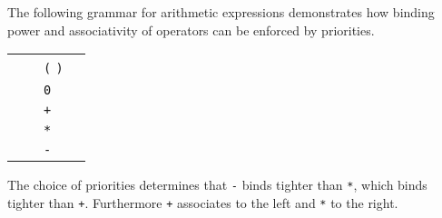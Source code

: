 \begin{isabellebody}
\begin{isamarkuptext}
  \medskip The following grammar for arithmetic expressions
  demonstrates how binding power and associativity of operators can be
  enforced by priorities.

  \begin{center}
  \begin{tabular}{rclr}
  \isa{{\isachardoublequote}A\isactrlsup {\isacharparenleft}\isactrlsup {\isadigit{1}}\isactrlsup {\isadigit{0}}\isactrlsup {\isadigit{0}}\isactrlsup {\isadigit{0}}\isactrlsup {\isacharparenright}{\isachardoublequote}} & \isa{{\isachardoublequote}{\isacharequal}{\isachardoublequote}} & \verb|(| \isa{{\isachardoublequote}A\isactrlsup {\isacharparenleft}\isactrlsup {\isadigit{0}}\isactrlsup {\isacharparenright}{\isachardoublequote}} \verb|)| \\
  \isa{{\isachardoublequote}A\isactrlsup {\isacharparenleft}\isactrlsup {\isadigit{1}}\isactrlsup {\isadigit{0}}\isactrlsup {\isadigit{0}}\isactrlsup {\isadigit{0}}\isactrlsup {\isacharparenright}{\isachardoublequote}} & \isa{{\isachardoublequote}{\isacharequal}{\isachardoublequote}} & \verb|0| \\
  \isa{{\isachardoublequote}A\isactrlsup {\isacharparenleft}\isactrlsup {\isadigit{0}}\isactrlsup {\isacharparenright}{\isachardoublequote}} & \isa{{\isachardoublequote}{\isacharequal}{\isachardoublequote}} & \isa{{\isachardoublequote}A\isactrlsup {\isacharparenleft}\isactrlsup {\isadigit{0}}\isactrlsup {\isacharparenright}{\isachardoublequote}} \verb|+| \isa{{\isachardoublequote}A\isactrlsup {\isacharparenleft}\isactrlsup {\isadigit{1}}\isactrlsup {\isacharparenright}{\isachardoublequote}} \\
  \isa{{\isachardoublequote}A\isactrlsup {\isacharparenleft}\isactrlsup {\isadigit{2}}\isactrlsup {\isacharparenright}{\isachardoublequote}} & \isa{{\isachardoublequote}{\isacharequal}{\isachardoublequote}} & \isa{{\isachardoublequote}A\isactrlsup {\isacharparenleft}\isactrlsup {\isadigit{3}}\isactrlsup {\isacharparenright}{\isachardoublequote}} \verb|*| \isa{{\isachardoublequote}A\isactrlsup {\isacharparenleft}\isactrlsup {\isadigit{2}}\isactrlsup {\isacharparenright}{\isachardoublequote}} \\
  \isa{{\isachardoublequote}A\isactrlsup {\isacharparenleft}\isactrlsup {\isadigit{3}}\isactrlsup {\isacharparenright}{\isachardoublequote}} & \isa{{\isachardoublequote}{\isacharequal}{\isachardoublequote}} & \verb|-| \isa{{\isachardoublequote}A\isactrlsup {\isacharparenleft}\isactrlsup {\isadigit{3}}\isactrlsup {\isacharparenright}{\isachardoublequote}} \\
  \end{tabular}
  \end{center}
  The choice of priorities determines that \verb|-| binds
  tighter than \verb|*|, which binds tighter than \verb|+|.  Furthermore \verb|+| associates to the left and
  \verb|*| to the right.


\end{isamarkuptext}
\end{isabellebody}
